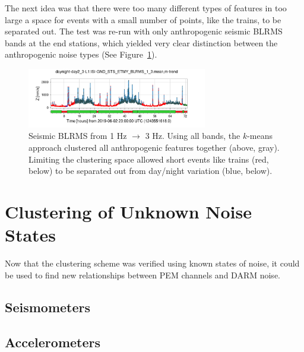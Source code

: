 \documentclass[colorlinks=true,pdfstartview=FitV,linkcolor=blue,
            citecolor=red,urlcolor=magenta]{ligodoc}
\begin{document}
The next idea was that there were too many different types of features in too large a space for events with a small number of points, like the trains, to be separated out.
The test was re-run with only anthropogenic seismic BLRMS bands at the end stations, which yielded very clear distinction between the anthropogenic noise types (See Figure~\ref{fig:trains}).

\begin{figure}
  \includegraphics[width=0.7\textwidth]{assets/final/daynight-day2_3-L1:ISI-GND_STS_ETMY_BLRMS_1_3mean,m-trend.png}
  
  \caption{Seismic BLRMS from 1 Hz $\to$ 3 Hz. Using all bands, the $k$-means approach clustered all anthropogenic features together (above, gray). Limiting the clustering space allowed short events like trains (red, below) to be separated out from day/night variation (blue, below).}\label{fig:trains}
\end{figure}

\section{Clustering of Unknown Noise States}\label{sec:unknown}
Now that the clustering scheme was verified using known states of noise, it could be used to find new relationships between PEM channels and DARM noise.

\subsection{Seismometers}

\subsection{Accelerometers}
\end{document}

